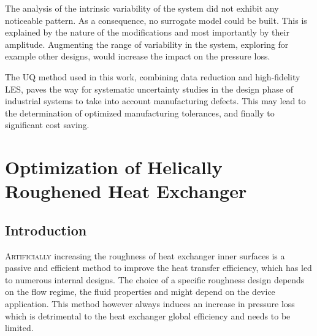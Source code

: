 The analysis of the intrinsic variability of the system did not exhibit any noticeable pattern. As a consequence, no surrogate model could be built. This is explained by the nature of the modifications and most importantly by their amplitude. Augmenting the range of variability in the system, exploring for example other designs, would increase the impact on the pressure loss. %

The UQ method used in this work, combining data reduction and high-fidelity LES, paves the way for systematic uncertainty studies in the design phase of industrial systems to take into account manufacturing defects. This may lead to the determination of optimized manufacturing tolerances, and finally to significant cost saving.

\chapter{Optimization of Helically Roughened Heat Exchanger}\label{chap:optim}

\section{Introduction}

\lettrine{A}{rtificially} increasing the roughness of heat exchanger inner surfaces is a passive and efficient method to improve the heat transfer efficiency, which has led to numerous internal designs. The choice of a specific roughness design depends on the flow regime, the fluid properties and might depend on the device application. This method however always induces an increase in pressure loss which is detrimental to the heat exchanger global efficiency and needs to be limited.

